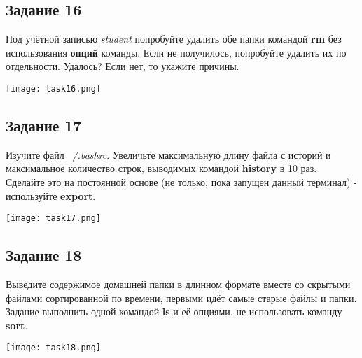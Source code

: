 \documentclass[12pt, a4paper]{report}
\begin{document}
			\subsection*{Задание 16}
			Под учётной записью \textit{student} попробуйте удалить обе папки командой \textbf{rm} без использования \textbf{опций} команды. Если не получилось, попробуйте удалить их по отдельности. Удалось? Если нет, то укажите причины.
			\lstset{style=mystyle}
			
			\begin{center}
				\texttt{[image: task16.png]}
			\end{center}

			\subsection*{Задание 17}
			Изучите файл \textit{~/.bashrc}. Увеличьте максимальную длину файла с историй и максимальное количество строк, выводимых командой \textbf{history} в \underline{10} раз. Сделайте это на постоянной основе (не только, пока запущен данный терминал) - используйте \textbf{export}.
			\lstset{style=mystyle}
			
			\begin{center}
				\texttt{[image: task17.png]}
			\end{center}

			\subsection*{Задание 18}
			Выведите содержимое домашней папки в длинном формате вместе со скрытыми файлами сортированной по времени, первыми идёт самые старые файлы и папки. Задание выполнить одной командой \textbf{ls} и её опциями, не использовать команду \textbf{sort}.
			\lstset{style=mystyle}
			
			\begin{center}
				\texttt{[image: task18.png]}
			\end{center}
\end{document}
